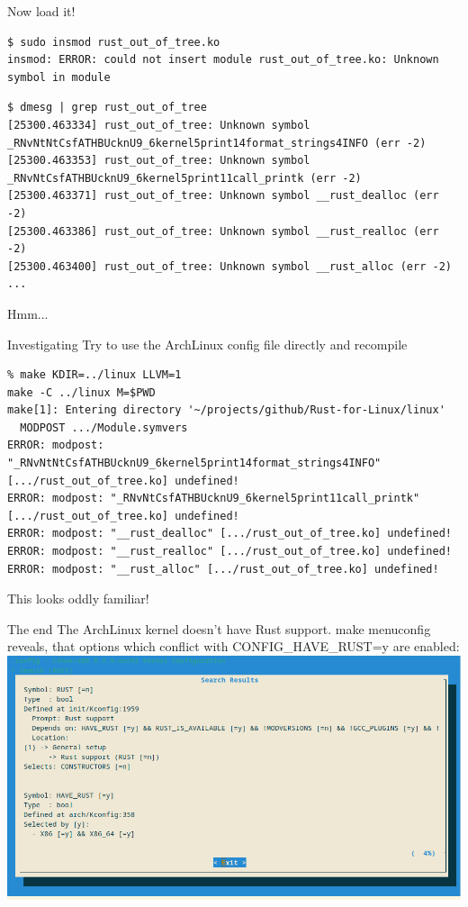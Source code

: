 \begin{frame}[c,fragile]{Now load it!}
\begin{verbatim}
$ sudo insmod rust_out_of_tree.ko
insmod: ERROR: could not insert module rust_out_of_tree.ko: Unknown symbol in module
\end{verbatim}
\begin{verbatim}
$ dmesg | grep rust_out_of_tree
[25300.463334] rust_out_of_tree: Unknown symbol _RNvNtNtCsfATHBUcknU9_6kernel5print14format_strings4INFO (err -2)
[25300.463353] rust_out_of_tree: Unknown symbol _RNvNtCsfATHBUcknU9_6kernel5print11call_printk (err -2)
[25300.463371] rust_out_of_tree: Unknown symbol __rust_dealloc (err -2)
[25300.463386] rust_out_of_tree: Unknown symbol __rust_realloc (err -2)
[25300.463400] rust_out_of_tree: Unknown symbol __rust_alloc (err -2)
...
\end{verbatim}
\pause Hmm...
\end{frame}

\begin{frame}[c,fragile]{Investigating}
Try to use the ArchLinux config file directly and recompile
\begin{verbatim}
% make KDIR=../linux LLVM=1
make -C ../linux M=$PWD
make[1]: Entering directory '~/projects/github/Rust-for-Linux/linux'
  MODPOST .../Module.symvers
ERROR: modpost: "_RNvNtNtCsfATHBUcknU9_6kernel5print14format_strings4INFO" [.../rust_out_of_tree.ko] undefined!
ERROR: modpost: "_RNvNtCsfATHBUcknU9_6kernel5print11call_printk" [.../rust_out_of_tree.ko] undefined!
ERROR: modpost: "__rust_dealloc" [.../rust_out_of_tree.ko] undefined!
ERROR: modpost: "__rust_realloc" [.../rust_out_of_tree.ko] undefined!
ERROR: modpost: "__rust_alloc" [.../rust_out_of_tree.ko] undefined!
\end{verbatim}
\pause This looks oddly familiar!
\end{frame}

\begin{frame}[c,fragile]{The end}
\small The ArchLinux kernel doesn't have Rust support. make menuconfig
reveals, that options which conflict with CONFIG\_HAVE\_RUST=y are enabled:
\includegraphics[height=0.75\textheight]{img/make-menuconfig.png}
\end{frame}


